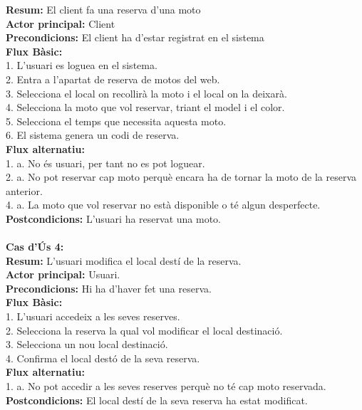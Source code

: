\documentclass{article}
\begin{document}
\textbf{Resum:} El client fa una reserva d'una moto\\
\textbf{Actor principal:} Client\\
\textbf{Precondicions:} El client ha d'estar registrat en el sistema\\
\textbf{Flux B\`asic:}\\
1. L'usuari es loguea en el sistema.\\
2. Entra a l'apartat de reserva de motos del web.\\
3. Selecciona e\textbf{}l local on recollir\`a la moto i el local on la deixar\`a.\\
4. Selecciona la moto que vol reservar, triant el model i el color.\\
5. Selecciona el temps que necessita aquesta moto.\\
6. El sistema genera un codi de reserva.\\
\textbf{Flux alternatiu:}\\
1. a. No \'es usuari, per tant no es pot loguear.\\
2. a. No pot reservar cap moto perquè encara ha de tornar la moto de la reserva anterior.\\
4. a. La moto que vol reservar no est\`a disponible o t\'e algun desperfecte.\\
\textbf{Postcondicions:} L'usuari ha reservat una moto.\\\\
\textbf{Cas d'\'Us 4:}\\
\textbf{Resum:} L'usuari modifica el local dest\'i de la reserva.\\
\textbf{Actor principal:} Usuari.\\
\textbf{Precondicions:} Hi ha d'haver fet una reserva.\\
\textbf{Flux B\`asic:}\\
1. L'usuari accedeix a les seves reserves.\\
2. Selecciona la reserva la qual vol modificar el local destinació.\\
3. Selecciona un nou local destinaci\'o.\\
4. Confirma el local dest\'o de la seva reserva.\\
\textbf{Flux alternatiu:\\}
1. a. No pot accedir a les seves reserves perqu\`e no t\'e cap moto reservada.\\
\textbf{Postcondicions:} El local dest\'i de la seva reserva ha estat modificat.\\\\
\end{document}
